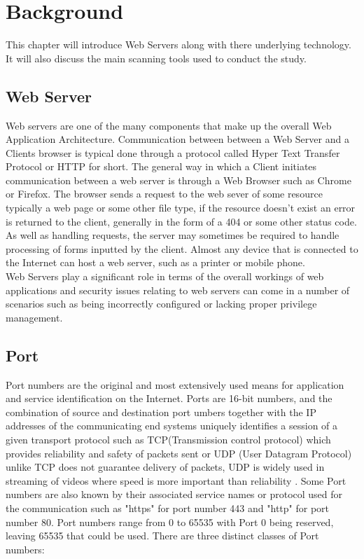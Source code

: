 \documentclass[a4wide,leqno,12pt]{report}
\begin{document}
\chapter{Background}
This chapter will introduce Web Servers along with there underlying technology. It will also discuss the main scanning tools used to conduct the study.
\section{Web Server}

Web servers are one of the many components that make up the overall Web Application Architecture.
Communication between between a Web Server and a Clients browser is typical done through a protocol called Hyper Text Transfer Protocol or HTTP for short. The general way in which a Client initiates communication between a web server is through a Web Browser such as Chrome or Firefox. The browser sends a request to the web sever of some resource typically a web page or some other file type, if the resource doesn't exist an error is returned to the client, generally in the form of a 404 or some other status code. As well as handling requests, the server may sometimes be required to handle processing of forms inputted by the client\cite{conallen1999modeling}. Almost any device that is connected to the Internet can host a web server, such as a printer or mobile phone. \\

Web Servers play a significant role in terms of the overall workings of web applications and security issues relating to web servers can come in a number of scenarios such as being incorrectly configured\cite{mendes2008assessing} or lacking proper privilege management.
\section{Port}
Port numbers are the original and most extensively used means for application and service identification on the Internet. Ports are 16-bit numbers, and the combination of source and destination port umbers together with the IP addresses of the communicating end systems uniquely identifies a session of a given transport protocol \cite{cotton2011internet} such as TCP(Transmission control protocol) which provides reliability and safety of packets sent  or UDP (User Datagram Protocol) unlike TCP does not guarantee delivery of packets, UDP is widely used in streaming of videos where speed is more important than reliability \cite{khan2016transport}. Some Port numbers are also known by their associated service names or protocol used for the communication such as "https" for port number 443 and "http" for port number 80. Port numbers range from 0 to 65535 with Port 0 being reserved, leaving 65535 that could be used. There are three distinct classes of Port numbers:
\end{document}

